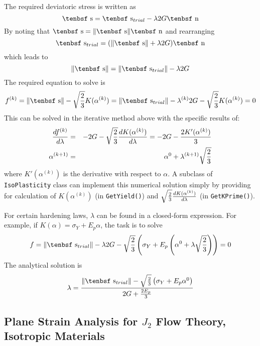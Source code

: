 \documentclass[11pt]{article}
\def\dev{\hbox{\tenbsf s}}
\def\ndev{\hbox{\tenbsf n}}
\def\code#1{{\small\tt #1}}
\begin{document}
The required deviatoric stress is written as
\begin{equation}
        \dev = \dev_{trial} - \lambda 2G\ndev
\end{equation}
By noting that $\dev=\|\dev\|\ndev$ and rearranging
\begin{equation}
      \dev_{trial} = (\|\dev\| + \lambda 2G)\ndev
\end{equation}
which leads to
\begin{equation}
         \|\dev\| =  \|\dev_{trial}\| - \lambda 2G
\end{equation}
The required equation to solve is
\begin{equation}
      f^{(k)} = \|\dev\| -  \sqrt{2\over3} K(\alpha^{(k)}) = \|\dev_{trial}\| - \lambda^{(k)} 2G -  \sqrt{2\over3} K(\alpha^{(k)}) = 0
\end{equation}
This can be solved in the iterative method above with the specific results of:
\begin{eqnarray}
        {df^{(k)}\over d\lambda} & = & -2G - \sqrt{2\over3}{dK(\alpha^{(k)})\over d\lambda}  = -2G - {2K'(\alpha^{(k)})\over 3} \\
        \alpha^{(k+1)} & = & \alpha^{0} +  \lambda^{(k+1)} \sqrt{2\over3}
\end{eqnarray}
where $K'(\alpha^{(k)})$ is the derivative with respect to $\alpha$. A subclass of \code{IsoPlasticity} class can implement this numerical solution simply by providing for calculation of $K(\alpha^{(k)})$ (in \code{GetYield()}) and $\sqrt{2\over3}{dK(\alpha^{(k)})\over d\lambda}$ (in \code{GetKPrime()}).

For certain hardening laws, $\lambda$ can be found in a closed-form expression. For example, if $K(\alpha)=\sigma_Y + E_p\alpha$, the task is to solve
\begin{equation}
      f =  \|\dev_{trial}\| - \lambda 2G -  \sqrt{2\over3} \left(\sigma_Y + E_p\left(\alpha^{0}+ \lambda \sqrt{2\over3}\right)\right) = 0
\end{equation}
The analytical solution is
\begin{equation}
      \lambda = { \|\dev_{trial}\| - \sqrt{2\over3}\left(\sigma_Y + E_p\alpha^{0} \right) \over  2G +  {2E_p\over3} }
\end{equation}

\subsection{Plane Strain Analysis for $J_2$ Flow Theory, Isotropic Materials}
\end{document}
